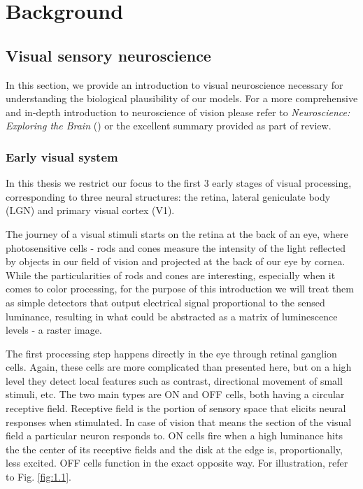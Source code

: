 \chapter{Background}\label{ch:1}

\section{Visual sensory neuroscience}
In this section, we provide an introduction to visual neuroscience necessary for understanding the biological plausibility of our models. For a more comprehensive and in-depth introduction to neuroscience of vision please refer to \textit{Neuroscience: Exploring the Brain} (\cite{bear_neuroscience:_2007}) or the excellent summary provided as part of \cite{Carandini10577} review.

\subsection{Early visual system}\label{ch:1.1.1}
In this thesis we restrict our focus to the first 3 early stages of visual processing, corresponding to three neural structures: the retina, lateral geniculate body (LGN) and primary visual cortex (V1).

The journey of a visual stimuli starts on the retina at the back of an eye, where photosensitive cells - rods and cones measure the intensity of the light reflected by objects in our field of vision and projected at the back of our eye by cornea. While the particularities of rods and cones are interesting, especially when it comes to color processing, for the purpose of this introduction we will treat them as simple detectors that output electrical signal proportional to the sensed luminance, resulting in what could be abstracted as a matrix of luminescence levels - a raster image. 

The first processing step happens directly in the eye through retinal ganglion cells. Again, these cells are more complicated than presented here, but on a high level they detect local features such as contrast, directional movement of small stimuli, etc. The two main types are ON and OFF cells, both having a circular receptive field. Receptive field is the portion of sensory space that elicits neural responses when stimulated. In case of vision that means the section of the visual field a particular neuron responds to. ON cells fire when a high luminance hits the the center of its receptive fields and the disk at the edge is, proportionally, less excited. OFF cells function in the exact opposite way. For illustration, refer to Fig. \ref{fig:1.1}.

